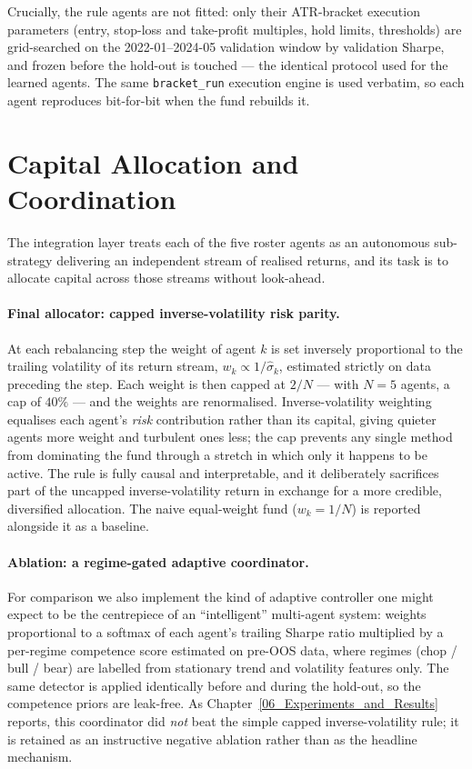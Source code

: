 Crucially, the rule agents are not fitted: only their ATR-bracket execution parameters (entry, stop-loss and take-profit multiples, hold limits, thresholds) are grid-searched on the 2022-01--2024-05 validation window by validation Sharpe, and frozen before the hold-out is touched --- the identical protocol used for the learned agents. The same \texttt{bracket\_run} execution engine is used verbatim, so each agent reproduces bit-for-bit when the fund rebuilds it.

\section{Capital Allocation and Coordination}
\label{sec:allocation}

The integration layer treats each of the five roster agents as an autonomous sub-strategy delivering an independent stream of realised returns, and its task is to allocate capital across those streams without look-ahead.

\paragraph{Final allocator: capped inverse-volatility risk parity.}
At each rebalancing step the weight of agent $k$ is set inversely proportional to the trailing volatility of its return stream, $w_k \propto 1/\hat{\sigma}_k$, estimated strictly on data preceding the step. Each weight is then capped at $2/N$ --- with $N = 5$ agents, a cap of $40\%$ --- and the weights are renormalised. Inverse-volatility weighting equalises each agent's \textit{risk} contribution rather than its capital, giving quieter agents more weight and turbulent ones less; the cap prevents any single method from dominating the fund through a stretch in which only it happens to be active. The rule is fully causal and interpretable, and it deliberately sacrifices part of the uncapped inverse-volatility return in exchange for a more credible, diversified allocation. The naive equal-weight fund ($w_k = 1/N$) is reported alongside it as a baseline.

\paragraph{Ablation: a regime-gated adaptive coordinator.}
For comparison we also implement the kind of adaptive controller one might expect to be the centrepiece of an ``intelligent'' multi-agent system: weights proportional to a softmax of each agent's trailing Sharpe ratio multiplied by a per-regime competence score estimated on pre-OOS data, where regimes (chop / bull / bear) are labelled from stationary trend and volatility features only. The same detector is applied identically before and during the hold-out, so the competence priors are leak-free. As Chapter~\ref{06_Experiments_and_Results} reports, this coordinator did \textit{not} beat the simple capped inverse-volatility rule; it is retained as an instructive negative ablation rather than as the headline mechanism.

